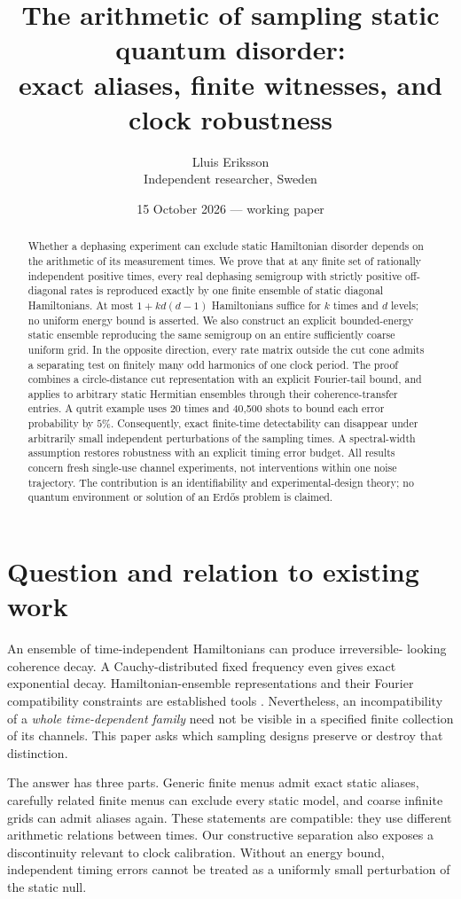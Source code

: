 \documentclass[11pt,a4paper]{article}
\title{The arithmetic of sampling static quantum disorder:\\exact aliases, finite witnesses, and clock robustness}
\author{Lluis Eriksson\\\small Independent researcher, Sweden}
\date{15 October 2026 --- working paper}
\theoremstyle{remark}\newtheorem{remark}[theorem]{Remark}
\begin{document}
\maketitle
\begin{abstract}
Whether a dephasing experiment can exclude static Hamiltonian disorder
depends on the arithmetic of its measurement times. We prove that at any
finite set of rationally independent positive times, every real dephasing
semigroup with strictly positive off-diagonal rates is reproduced exactly
by one finite ensemble of static diagonal Hamiltonians. At most
$1+k d(d-1)$ Hamiltonians suffice for $k$ times and $d$ levels; no uniform
energy bound is asserted. We also construct an explicit bounded-energy
static ensemble reproducing the same semigroup on an entire sufficiently
coarse uniform grid. In the opposite direction, every rate matrix outside
the cut cone admits a separating test on finitely many odd harmonics of
one clock period. The proof combines a circle-distance cut representation
with an explicit Fourier-tail bound, and applies to arbitrary static
Hermitian ensembles through their coherence-transfer entries. A qutrit
example uses 20 times and 40,500 shots to bound each error probability by
$5\%$. Consequently, exact finite-time detectability can disappear under
arbitrarily small independent perturbations of the sampling times. A
spectral-width assumption restores robustness with an explicit timing
error budget. All results concern fresh single-use channel experiments,
not interventions within one noise trajectory. The contribution is an
identifiability and experimental-design theory; no quantum environment or
solution of an Erd\H{o}s problem is claimed.
\end{abstract}

\section{Question and relation to existing work}
An ensemble of time-independent Hamiltonians can produce irreversible-
looking coherence decay. A Cauchy-distributed fixed frequency even gives
exact exponential decay. Hamiltonian-ensemble representations and their
Fourier compatibility constraints are established tools
\cite{chen2018,chen2019,chen2021,kropf}. Nevertheless, an incompatibility
of a \emph{whole time-dependent family} need not be visible in a specified
finite collection of its channels. This paper asks which sampling designs
preserve or destroy that distinction.

The answer has three parts. Generic finite menus admit exact static
aliases, carefully related finite menus can exclude every static model,
and coarse infinite grids can admit aliases again. These statements are
compatible: they use different arithmetic relations between times.
Our constructive separation also exposes a discontinuity relevant to
clock calibration. Without an energy bound, independent timing errors
cannot be treated as a uniformly small perturbation of the static null.
\end{document}
